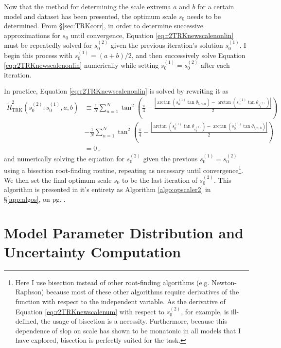 Now that the method for determining the scale extrema $a$ and $b$ for a certain model and dataset has been presented, the optimum scale $s_0$ needs to be determined. From \S\ref{sec:TRKcorr}, in order to determine successive approximations for $s_0$ until convergence, Equation \eqref{eq:r2TRKnewscalenonlin} must be repeatedly solved for $s_0^{(2)}$ given the previous iteration's solution $s_0^{(1)}$. I begin this process with $s_0^{(1)}=(a+b)/2$, and then successively solve Equation \eqref{eq:r2TRKnewscalenonlin} numerically while setting $s_0^{(1)} = s_0^{(2)}$ after each iteration.

In practice, Equation \eqref{eq:r2TRKnewscalenonlin} is solved by rewriting it as
\begin{align}\label{eq:r2TRKnewscalenum}
\tilde{R}^2_{\mathrm{TRK}}(s_0^{(2)};s_0^{(1)}, a, b) & \equiv \frac{1}{N}\sum_{n=1}^{N}\tan^2\left(\frac{\pi}{4}-\frac{\left|\arctan  (s_0^{(1)}\tan\theta_{t,n;a})-\arctan  (s_0^{(1)}\tan\theta_{s_0^{(2)}})\right|}{2}\right) \nonumber \\
& -
\frac{1}{N}\sum_{n=1}^{N}\tan^2\left(\frac{\pi}{4}-\frac{\left|\arctan  (s_0^{(1)}\tan\theta_{s_0^{(2)}})-\arctan  (s_0^{(1)}\tan\theta_{t,n;b})\right|}{2}\right)\nonumber\\
& =0 \, ,
\end{align}
and numerically solving the equation for $s_0^{(2)}$ given the previous $s_0^{(1)} = s_0^{(2)}$ using a bisection root-finding routine, repeating as necessary until convergence\footnote{Here I use bisection instead of other root-finding algorithms (e.g. Newton-Raphson) because most of these other algorithms require derivatives of the function with respect to the independent variable. As the derivative of Equation \eqref{eq:r2TRKnewscalenum} with respect to $s_0^{(2)}$, for example, is ill-defined, the usage of bisection is a necessity. Furthermore, because this dependence of slop on scale has shown to be monatonic in all models that I have explored, bisection is perfectly suited for the task.}. We then set the final optimum scale $s_0$ to be the last iteration of $s_0^{(2)}$. This algorithm is presented in it's entirety as Algorithm \ref{algo:opscaler2} in \S\ref{app:algos}, on pg. \pageref{algo:opscaler2}.

\section{Model Parameter Distribution and Uncertainty Computation}
